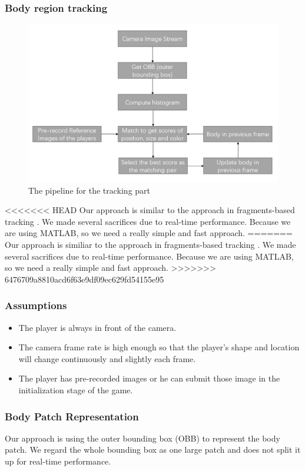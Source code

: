 \documentclass[11pt,twocolumn,letterpaper]{article}
\begin{document}
\subsubsection{Body region tracking}
      \begin{figure}[h]
      \centering
      \includegraphics[width=\linewidth]{./Pic/tracking-pipeline.png}
      \caption{The pipeline for the tracking part}
      \end{figure}
\par
<<<<<<< HEAD
Our approach is similar to the approach in fragments-based tracking  \cite{1640835}. We made several sacrifices due to real-time performance. Because  we are using MATLAB, so we need a really simple and fast approach. 
=======
Our approach is similiar to the approach in fragments-based tracking  \cite{1640835}. We made several sacrifices due to real-time performance. Because  we are using MATLAB, so we need a really simple and fast approach. 
>>>>>>> 6476709a8810acd6f63e9df09ec629fd54155e95
\par
\subsubsection*{Assumptions}
\begin{itemize}
\item The player is always in front of the camera.
\item The camera frame rate is high enough so that the player's shape and location will change continuously and slightly each frame.
\item The player has pre-recorded images or he can submit those image in the initialization stage of the game.
\end{itemize}
\subsubsection*{Body Patch Representation}
\par
Our approach is using the outer bounding box (OBB) to represent the body patch. We regard the whole bounding box as one large patch and does not split it up for real-time performance.
\end{document}
